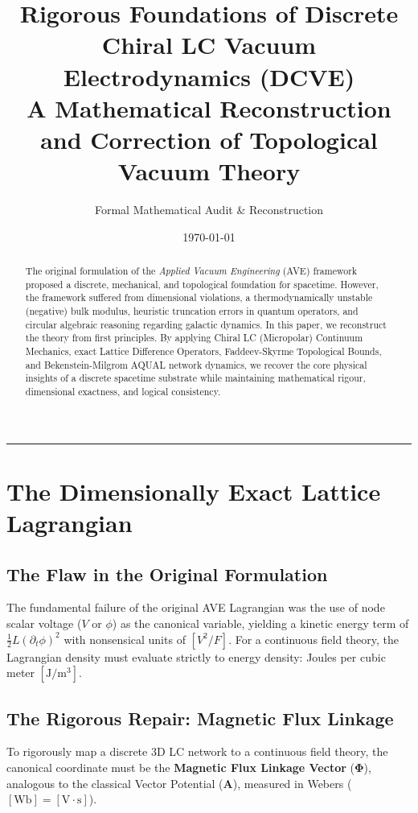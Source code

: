 \documentclass[11pt,a4paper]{article}
\title{\textbf{Rigorous Foundations of Discrete Chiral LC Vacuum Electrodynamics (DCVE)}\\
\large A Mathematical Reconstruction and Correction of Topological Vacuum Theory}
\author{Formal Mathematical Audit \& Reconstruction}
\date{\today}
\begin{document}
\maketitle

\begin{abstract}
The original formulation of the \textit{Applied Vacuum Engineering} (AVE) framework proposed a discrete, mechanical, and topological foundation for spacetime. However, the framework suffered from dimensional violations, a thermodynamically unstable (negative) bulk modulus, heuristic truncation errors in quantum operators, and circular algebraic reasoning regarding galactic dynamics. In this paper, we reconstruct the theory from first principles. By applying Chiral LC (Micropolar) Continuum Mechanics, exact Lattice Difference Operators, Faddeev-Skyrme Topological Bounds, and Bekenstein-Milgrom AQUAL network dynamics, we recover the core physical insights of a discrete spacetime substrate while maintaining mathematical rigour, dimensional exactness, and logical consistency.
\end{abstract}

\tableofcontents
\vspace{1em}
\hrule
\vspace{2em}

\section{The Dimensionally Exact Lattice Lagrangian}

\subsection{The Flaw in the Original Formulation}
The fundamental failure of the original AVE Lagrangian was the use of node scalar voltage ($V$ or $\phi$) as the canonical variable, yielding a kinetic energy term of $\frac{1}{2} L (\partial_t \phi)^2$ with nonsensical units of $[V^2/F]$. For a continuous field theory, the Lagrangian density must evaluate strictly to energy density: Joules per cubic meter $[\text{J}/\text{m}^3]$.

\subsection{The Rigorous Repair: Magnetic Flux Linkage}
To rigorously map a discrete 3D LC network to a continuous field theory, the canonical coordinate must be the \textbf{Magnetic Flux Linkage Vector} ($\mathbf{\Phi}$), analogous to the classical Vector Potential ($\mathbf{A}$), measured in Webers ($[\text{Wb}] = [\text{V} \cdot \text{s}]$).
\end{document}
